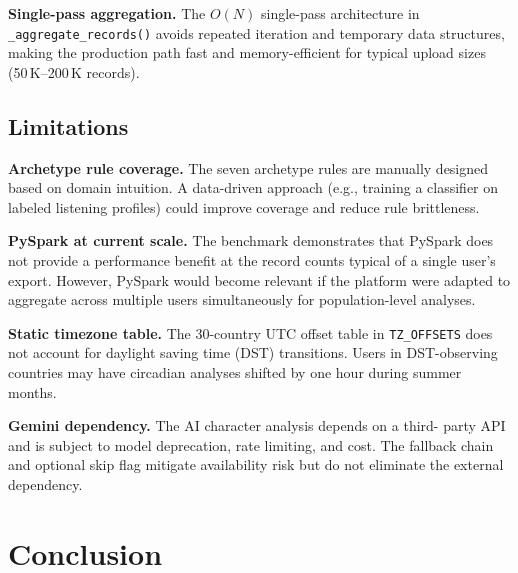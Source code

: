 \documentclass[conference]{IEEEtran}
\begin{document}
\textbf{Single-pass aggregation.} The $O(N)$ single-pass architecture in
\texttt{\_aggregate\_records()} avoids repeated iteration and
temporary data structures, making the production path fast and
memory-efficient for typical upload sizes (50\,K–200\,K records).

\subsection{Limitations}

\textbf{Archetype rule coverage.} The seven archetype rules are manually
designed based on domain intuition. A data-driven approach
(e.g., training a classifier on labeled listening profiles) could
improve coverage and reduce rule brittleness.

\textbf{PySpark at current scale.} The benchmark demonstrates that PySpark
does not provide a performance benefit at the record counts typical of a
single user's export. However, PySpark would become relevant if the
platform were adapted to aggregate across multiple users simultaneously
for population-level analyses.

\textbf{Static timezone table.} The 30-country UTC offset table in
\texttt{TZ\_OFFSETS} does not account for daylight saving time (DST)
transitions. Users in DST-observing countries may have circadian analyses
shifted by one hour during summer months.

\textbf{Gemini dependency.} The AI character analysis depends on a third-
party API and is subject to model deprecation, rate limiting, and cost.
The fallback chain and optional skip flag mitigate availability risk but
do not eliminate the external dependency.

\section{Conclusion}
\end{document}
